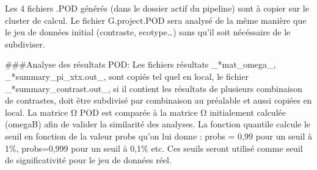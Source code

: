 \documentclass[
  openany]{book}
\newenvironment{Shaded}{\begin{snugshade}}{\end{snugshade}}
\newcommand{\AttributeTok}[1]{\textcolor[rgb]{0.13,0.29,0.53}{#1}}
\newcommand{\CommentTok}[1]{\textcolor[rgb]{0.56,0.35,0.01}{\textit{#1}}}
\newcommand{\ConstantTok}[1]{\textcolor[rgb]{0.56,0.35,0.01}{#1}}
\newcommand{\DecValTok}[1]{\textcolor[rgb]{0.00,0.00,0.81}{#1}}
\newcommand{\FunctionTok}[1]{\textcolor[rgb]{0.13,0.29,0.53}{\textbf{#1}}}
\newcommand{\NormalTok}[1]{#1}
\newcommand{\OtherTok}[1]{\textcolor[rgb]{0.56,0.35,0.01}{#1}}
\newcommand{\SpecialCharTok}[1]{\textcolor[rgb]{0.81,0.36,0.00}{\textbf{#1}}}
\newcommand{\StringTok}[1]{\textcolor[rgb]{0.31,0.60,0.02}{#1}}
\theoremstyle{definition}
\theoremstyle{definition}
\theoremstyle{definition}
\theoremstyle{definition}
\theoremstyle{remark}
\begin{document}
\begin{Shaded}
\end{Shaded}

Les 4 fichiers .POD générés (dans le dossier actif du pipeline) sont à copier sur le cluster de calcul. Le fichier G.project.POD sera analysé de la même manière que le jeu de données initial (contraste, ecotype\ldots) sans qu'il soit nécéssaire de le subdiviser.

\#\#\#Analyse des résultats POD:
Les fichiers résultats \_*mat\_omega\_, \_*summary\_pi\_xtx.out\_, sont copiés tel quel en local, le fichier \_*summary\_contrast.out\_, si il contient les résultats de plusieurs combinaison de contrastes, doit être subdivisé par combinaison au préalable et aussi copiées en local.
La matrice Ω POD est comparée à la matrice Ω initialement calculée (omegaB) afin de valider la similarité des analyses. La fonction quantile calcule le seuil en fonction de la valeur probs qu'on lui donne : probs = 0,99 pour un seuil à 1\%, probs=0,999 pour un seuil à 0,1\% etc.
Ces seuils seront utilisé comme seuil de significativité pour le jeu de données réel.
\end{document}
